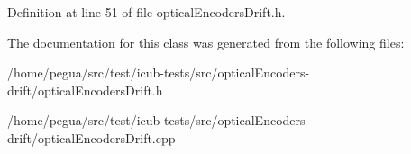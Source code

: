 Definition at line 51 of file optical\-Encoders\-Drift.\-h.



The documentation for this class was generated from the following files\-:\begin{DoxyCompactItemize}
\item 
/home/pegua/src/test/icub-\/tests/src/optical\-Encoders-\/drift/optical\-Encoders\-Drift.\-h\item 
/home/pegua/src/test/icub-\/tests/src/optical\-Encoders-\/drift/optical\-Encoders\-Drift.\-cpp\end{DoxyCompactItemize}
